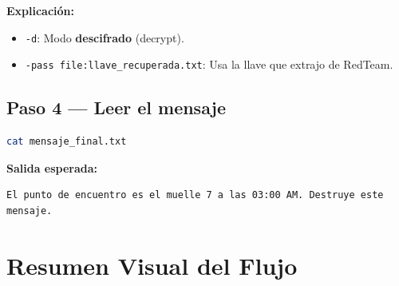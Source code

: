 \documentclass[11pt,a4paper]{article}
\begin{document}
\textbf{Explicación:}
\begin{itemize}
    \item \texttt{-d}: Modo \textbf{descifrado} (decrypt).
    \item \texttt{-pass file:llave\_recuperada.txt}: Usa la llave que extrajo de RedTeam.
\end{itemize}

\subsection{Paso 4 --- Leer el mensaje}

\begin{lstlisting}[language=bash, caption={Visualizar mensaje final}]
cat mensaje_final.txt
\end{lstlisting}

\textbf{Salida esperada:}
\begin{verbatim}
El punto de encuentro es el muelle 7 a las 03:00 AM. Destruye este mensaje.
\end{verbatim}

\section{Resumen Visual del Flujo}
\end{document}
